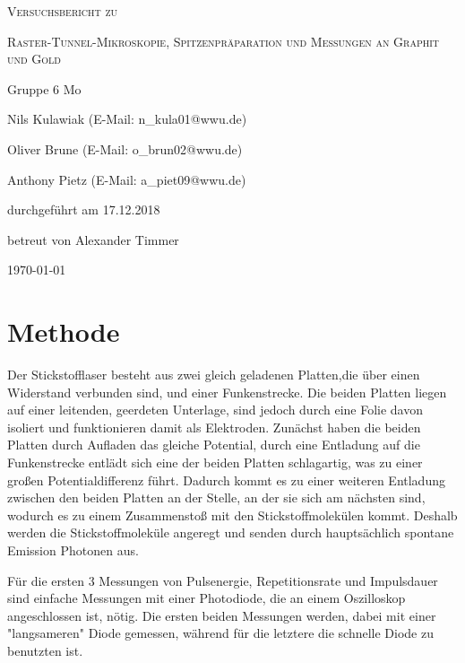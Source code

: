 \documentclass[
	a4paper,
	12pt,
	pagesize,
	ngerman
]{scrartcl}
\begin{document}
\begin{titlepage}
	\centering
	{\scshape\LARGE Versuchsbericht zu \par}
	\vspace{1cm}
	{\scshape\huge Raster-Tunnel-Mikroskopie, Spitzenpräparation und Messungen an Graphit und Gold     \par}
	\vspace{2.5cm}
	{\LARGE Gruppe 6 Mo\par}
	\vspace{0.5cm}
	{\large Nils Kulawiak (E-Mail: n\_kula01@wwu.de) \par}
	{\large Oliver Brune (E-Mail: o\_brun02@wwu.de) \par}
	{\large Anthony Pietz (E-Mail: a\_piet09@wwu.de) \par}
	\vfill
	durchgeführt am 17.12.2018\par
	
	\vfill
	betreut von Alexander Timmer\par
	
	\vfill
	{\large \today\par}
\end{titlepage}

\tableofcontents
\newpage

\section{Methode}
Der Stickstofflaser besteht aus zwei gleich geladenen Platten,die über einen Widerstand verbunden sind, und einer Funkenstrecke. Die beiden Platten liegen auf einer leitenden, geerdeten Unterlage, sind jedoch durch eine Folie davon isoliert und funktionieren damit als Elektroden. Zunächst haben die beiden Platten durch Aufladen das gleiche Potential, durch eine Entladung auf die Funkenstrecke entlädt sich eine der beiden Platten schlagartig, was zu einer großen Potentialdifferenz führt. Dadurch kommt es zu einer weiteren Entladung zwischen den beiden Platten an der Stelle, an der sie sich am nächsten sind, wodurch es zu einem Zusammenstoß mit den Stickstoffmolekülen kommt. Deshalb werden die Stickstoffmoleküle angeregt und senden durch hauptsächlich spontane Emission Photonen aus. %

Für die ersten 3 Messungen von Pulsenergie, Repetitionsrate und Impulsdauer sind einfache Messungen mit einer Photodiode, die an einem Oszilloskop angeschlossen ist, nötig. Die ersten beiden Messungen werden, dabei mit einer "langsameren" Diode gemessen, während für die letztere die schnelle Diode zu benutzten ist.
\end{document}
